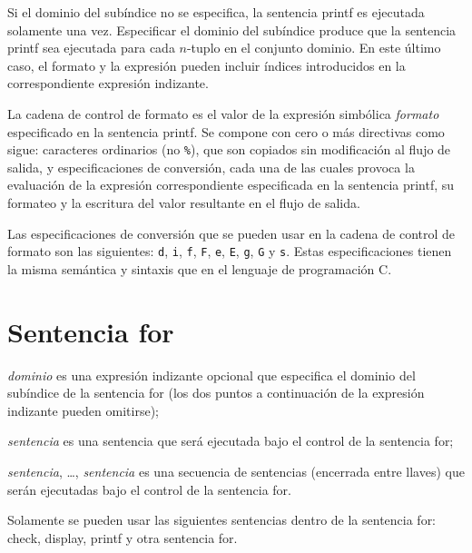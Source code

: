 \documentclass[11pt,spanish]{report}
\begin{document}
Si el dominio del subíndice no se especifica, la sentencia printf es ejecutada solamente una vez. Especificar el dominio del subíndice produce que la sentencia printf sea ejecutada para cada $n$-tuplo en el conjunto dominio. En este último caso, el formato y la expresión pueden incluir índices introducidos en la correspondiente expresión indizante.

La cadena de control de formato es el valor de la expresión simbólica {\it formato} especificado en la sentencia printf. Se compone con cero o más directivas como sigue: caracteres ordinarios (no {\tt\%}), que son copiados sin modificación al flujo de salida, y especificaciones de conversión, cada una de las cuales provoca la evaluación de la expresión correspondiente especificada en la sentencia printf, su formateo y la escritura del valor resultante en el flujo de salida.

Las especificaciones de conversión que se pueden usar en la cadena de control de formato son las siguientes: {\tt d}, {\tt i}, {\tt f}, {\tt F}, {\tt e}, {\tt E}, {\tt g}, {\tt G} y {\tt s}. Estas especificaciones tienen la misma semántica y sintaxis que en el lenguaje de programación C.

\section{Sentencia for}

\noindent
{}

\medskip

\noindent
{\it dominio} es una expresión indizante opcional que especifica el dominio del subíndice de la sentencia for (los dos puntos a continuación de la expresión indizante pueden omitirse);

\noindent
{\it sentencia} es una sentencia que será ejecutada bajo el control de la sentencia for;

\noindent
{\it sentencia}, \dots, {\it sentencia} es una secuencia de sentencias (encerrada entre llaves) que serán ejecutadas bajo el control de la sentencia for.

Solamente se pueden usar las siguientes sentencias dentro de la sentencia for: check, display, printf y otra sentencia for.
\end{document}

